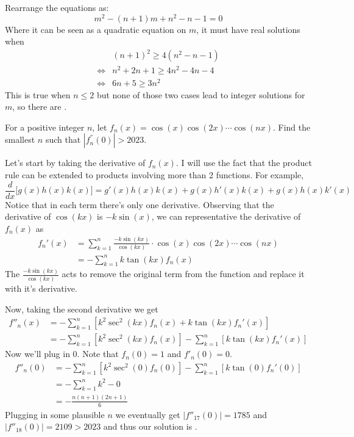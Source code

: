 \documentclass[12pt]{article}
\newcounter{problem}
\begin{document}
\begin{solution}
      Rearrange the equations as:
      $$m^2-(n+1)m+n^2-n-1=0$$
      Where it can be seen as a quadratic equation on $m$, it must have real solutions when
      \begin{align*}
         & (n+1)^2 \geq 4(n^2-n-1) \\
         \iff& n^2+2n+1 \geq 4n^2-4n-4 \\
         \iff& 6n+5 \geq 3n^2
      \end{align*}
      This is true when $n \leq 2$ but none of those two cases lead to integer solutions for $m$, so there are .
\end{solution}

\begin{problem}[D][4][Putnam 2023/A1]
   For a positive integer $n$, let $f_n(x)=\cos(x) \cos(2x) \cdots \cos(nx)$. Find the smallest $n$ such that $|f_n^{''}(0)|>2023$.%
\end{problem}

\begin{solution}[18]
   Let's start by taking the derivative of $f_n(x)$. I will use the fact that the product rule can be extended to products involving more than 2 functions. For example,
    \[
        \frac{d}{dx}\big[g(x)h(x)k(x)\big]=g'(x)h(x)k(x)+g(x)h'(x)k(x)+g(x)h(x)k'(x)
    \]
    Notice that in each term there's only one derivative. Observing that the derivative of $\cos(kx)$ is $-k\sin(x)$, we can representative the derivative of $f_n(x)$ as
    \begin{align*}
        f_n'(x) &= \sum_{k=1}^n\frac{-k\sin(kx)}{\cos(kx)}\cdot\cos(x) \cos(2x) \cdots \cos(nx) \\
        &= -\sum_{k=1}^nk\tan(kx)f_n(x)
    \end{align*}
    The $\frac{-k\sin(kx)}{\cos(kx)}$ acts to remove the original term from the function and replace it with it's derivative.

    Now, taking the second derivative we get
    \begin{align*}
        f''_n(x) &= -\sum_{k=1}^n\left[k^2\sec^2(kx)f_n(x)+k\tan(kx)f_n'(x)\right] \\
        &= -\sum_{k=1}^n\left[k^2\sec^2(kx)f_n(x)\right]-\sum_{k=1}^n\left[k\tan(kx)f_n'(x)\right]
    \end{align*}
    Now we'll plug in $0$. Note that $f_n(0)=1$ and $f'_n(0)=0$.
    \begin{align*}
        f''_n(0) &= -\sum_{k=1}^n\left[k^2\sec^2(0)f_n(0)\right]-\sum_{k=1}^n\left[k\tan(0)f_n'(0)\right]\\[1mm]
        &= -\sum_{k=1}^nk^2-0\\[1mm]
        &= -\frac{n(n+1)(2n+1)}{6}
    \end{align*}
    Plugging in some plausible $n$ we eventually get $|f''_{17}(0)|=1785$ and $|f''_{18}(0)|=2109>2023$ and thus our solution is .
\end{solution}
\end{document}
